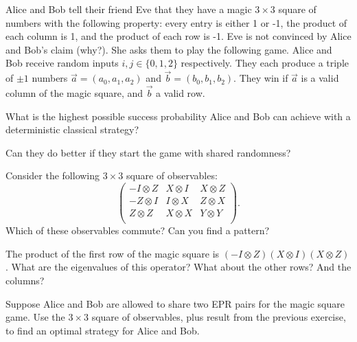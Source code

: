\documentclass[a4paper,10pt,landscape,twocolumn]{scrartcl}
\begin{document}
\begin{exercise}
	Alice and Bob tell their friend Eve that they have a magic $3 \times 3$ square of numbers with the following property: every entry is either 1 or -1, the product of each column is 1, and the product of each row is -1. Eve is not convinced by Alice and Bob's claim (why?). She asks them to play the following game. Alice and Bob receive random inputs $i,j \in \{0,1,2\}$ respectively. They each produce a triple of $\pm 1$ numbers $\vec{a} = (a_0, a_1, a_2)$ and $\vec{b} = (b_0, b_1, b_2)$. They win if $\vec{a}$ is a valid column of the magic square, and $\vec{b}$ a valid row.
	\begin{subex}
		What is the highest possible success probability Alice and Bob can achieve with a deterministic classical strategy?
	\end{subex}
	\begin{subex}
		Can they do better if they start the game with shared randomness?
	\end{subex}
	\begin{subex}
		Consider the following $3 \times 3$ square of observables:
		\[
		\left(
		\begin{array}{ccc}
		-I \otimes Z & X \otimes I & X \otimes Z\\
		-Z \otimes I & I \otimes X & Z \otimes X\\
		Z \otimes Z & X \otimes X & Y \otimes Y\\
		\end{array}
		\right).
		\]
		Which of these observables commute? Can you find a pattern?
	\end{subex}
	\begin{subex}
		The product of the first row of the magic square is $(-I \otimes Z)(X \otimes I)(X \otimes Z)$. What are the eigenvalues of this operator? What about the other rows? And the columns?
	\end{subex}
	\begin{subex}
		Suppose Alice and Bob are allowed to share two EPR pairs for the magic square game. Use the $3 \times 3$ square of observables, plus result from the previous exercise, to find an optimal strategy for Alice and Bob.
	\end{subex}
\end{exercise}
\end{document}
